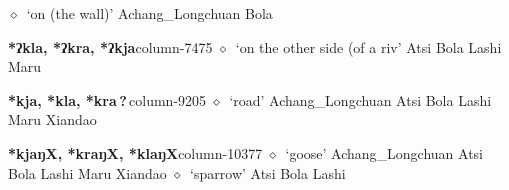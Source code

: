          $\diamond$~`on (the wall)'
         Achang\_Longchuan 
\hspace{1ex}
         Bola 
  \item {\footnotesize \textbf{*ʔkla, *ʔkra, *ʔkja}}{\tiny column-7475}
         $\diamond$~`on the other side (of a riv'
         Atsi 
\hspace{1ex}
         Bola 
\hspace{1ex}
         Lashi 
\hspace{1ex}
         Maru 
  \item {\footnotesize \textbf{*kja, *kla, *kra\,?\,}}{\tiny column-9205}
         $\diamond$~`road'
         Achang\_Longchuan 
\hspace{1ex}
         Atsi 
\hspace{1ex}
         Bola 
\hspace{1ex}
         Lashi 
\hspace{1ex}
         Maru 
\hspace{1ex}
         Xiandao 
  \item {\footnotesize \textbf{*kjaŋX, *kraŋX, *klaŋX}}{\tiny column-10377}
         $\diamond$~`goose'
         Achang\_Longchuan 
\hspace{1ex}
         Atsi 
\hspace{1ex}
         Bola 
\hspace{1ex}
         Lashi 
\hspace{1ex}
         Maru 
\hspace{1ex}
         Xiandao 
\hspace{1ex}
         $\diamond$~`sparrow'
         Atsi 
\hspace{1ex}
         Bola 
\hspace{1ex}
         Lashi 
